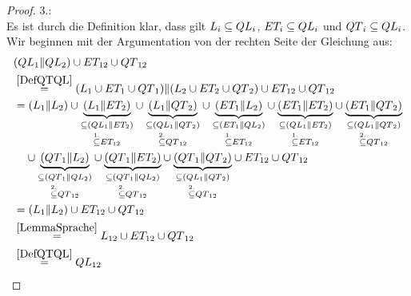 \begin{proof}
  3.:\\
  Es ist durch die Definition klar, dass gilt $L_i\subseteq QL{}_i$,
  $ET_i\subseteq QL{}_i$ und $QT{}_i\subseteq QL{}_i$. Wir beginnen mit der
  Argumentation von der rechten Seite der Gleichung aus:
  \begin{align*}
    &(QL{}_1\| QL{}_2)\cup ET_{12}\cup QT{}_{12}\\
    &\overset{\ref{DefQTQL}}{=}(L_1\cup ET_1\cup QT{}_1)\|(L_2\cup ET_2\cup
    QT{}_2)\cup ET_{12}\cup QT{}_{12}\\
    &=(L_1\|L_2)\cup
    \underset{\overset{1.}{\subseteq} ET_{12}}{\underset{\subseteq
    (QL{}_1\|ET_2)}{\underbrace{(L_1\|ET_2)}}} \cup
    \underset{\overset{2.}{\subseteq} QT{}_{12}}{\underset{\subseteq
    (QL{}_1\|QT{}_2)}{\underbrace{(L_1\|QT{}_2)}}} \cup
    \underset{\overset{1.}{\subseteq} ET_{12}}{\underset{\subseteq
    (ET_1\|QL{}_2)}{\underbrace{(ET_1\|L_2)}}} \cup
    \underset{\overset{1.}{\subseteq} ET_{12}}{\underset{\subseteq
    (QL{}_1\|ET_2)}{\underbrace{(ET_1\|ET_2)}}} \cup
    \underset{\overset{2.}{\subseteq} QT{}_{12}}{\underset{\subseteq
    (QL{}_1\|QT{}_2)}{\underbrace{(ET_1\|QT{}_2)}}}\\
    &\phantom{=}\;\cup\underset{\overset{2.}{\subseteq} QT{}_{12}}{\underset{\subseteq
    (QT{}_1\|QL{}_2)}{\underbrace{(QT{}_1\|L_2)}}} \cup
    \underset{\overset{2.}{\subseteq} QT{}_{12}}{\underset{\subseteq
    (QT{}_1\|QL{}_2)}{\underbrace{(QT{}_1\|ET_2)}}} \cup
    \underset{\overset{2.}{\subseteq} QT{}_{12}}{\underset{\subseteq
    (QL{}_1\|QT{}_2)}{\underbrace{(QT{}_1\|QT{}_2)}}} \cup
    ET_{12} \cup QT{}_{12}\\
    &=(L_1\|L_2) \cup ET_{12} \cup QT{}_{12}\\
    &\overset{\ref{LemmaSprache}}{=}L_{12}\cup ET_{12}\cup QT{}_{12}\\
    &\overset{\ref{DefQTQL}}{=}QL{}_{12}
  \end{align*}
\end{proof}
